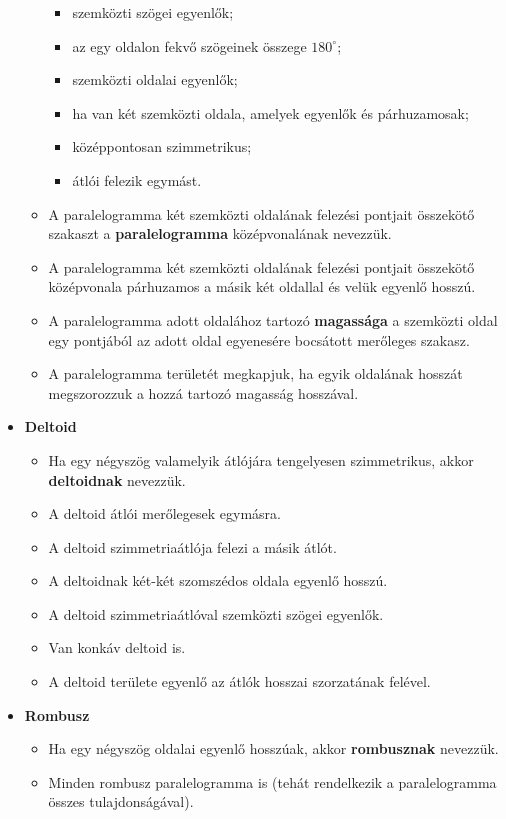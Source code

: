 \documentclass[a4paper,11pt]{article}
\begin{document}
\begin{itemize}
\begin{itemize}[label=$\circ$]
\begin{itemize}[label=$\cdot$]
\item szemközti szögei egyenlők;
\item az egy oldalon fekvő szögeinek összege $180^\circ$;
\item szemközti oldalai egyenlők;
\item ha van két szemközti oldala, amelyek egyenlők és párhuzamosak;
\item középpontosan szimmetrikus;
\item átlói felezik egymást.
\end{itemize}
\item A paralelogramma két szemközti oldalának felezési pontjait összekötő szakaszt a \textbf{paralelogramma} középvonalának nevezzük.
\item A paralelogramma két szemközti oldalának felezési pontjait összekötő középvonala párhuzamos a másik két oldallal és velük egyenlő hosszú.
\item A paralelogramma adott oldalához tartozó \textbf{magassága} a szemközti oldal egy pontjából az
adott oldal egyenesére bocsátott merőleges szakasz.
\item A paralelogramma területét megkapjuk, ha egyik oldalának hosszát megszorozzuk a hozzá tartozó magasság hosszával.
\end{itemize}
\item \textbf{Deltoid}
\begin{itemize}[label=$\circ$]
\item Ha egy négyszög valamelyik átlójára tengelyesen szimmetrikus, akkor \textbf{deltoidnak} nevezzük.
\item A deltoid átlói merőlegesek egymásra.
\item A deltoid szimmetriaátlója felezi a másik átlót.
\item A deltoidnak két-két szomszédos oldala egyenlő hosszú.
\item A deltoid szimmetriaátlóval szemközti szögei egyenlők.
\item Van konkáv deltoid is.
\item A deltoid területe egyenlő az átlók hosszai szorzatának felével.
\end{itemize}
\item \textbf{Rombusz}
\begin{itemize}[label=$\circ$]
\item Ha egy négyszög oldalai egyenlő hosszúak, akkor \textbf{rombusznak} nevezzük.
\item Minden rombusz paralelogramma is (tehát rendelkezik a paralelogramma összes tulajdonságával).

\end{itemize}
\end{itemize}
\end{document}
